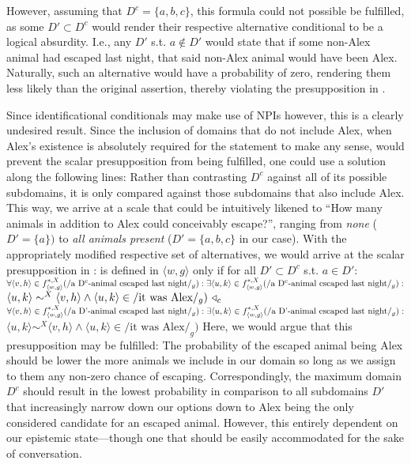 \xe
However, assuming that $D^c=\{a,b,c\}$, this formula could not possible be fulfilled, as some $D'\subset D^c$ would render their respective alternative conditional to be a logical absurdity. I.e., any $D'$ s.t. $a\not\in D'$ would state that if some non-Alex animal had escaped last night, that said non-Alex animal would have been Alex. Naturally, such an alternative would have a probability of zero, rendering them less likely than the original assertion, thereby violating the presupposition in . 

Since identificational conditionals may make use of NPIs however, this is a clearly undesired result. Since the inclusion of domains that do not include Alex, when Alex's existence is absolutely required for the statement to make any sense, would prevent the scalar presupposition from being fulfilled, one could use a solution along the following lines: Rather than contrasting $D^c$ against all of its possible subdomains, it is only compared against those subdomains that also include Alex. This way, we arrive at a scale that could be intuitively likened to \enquote{How many animals in addition to Alex could conceivably escape?}, ranging from \textit{none} ($D'=\{a\})$ to \textit{all animals present} ($D'=\{a,b,c\}$ in our case). With the appropriately modified respective set of alternatives, we would arrive at the scalar presupposition in :
\ex
{}\linebreak
is defined in $\langle w,g\rangle$ only if for all $D'\subset D^c$ s.t. $a\in D'$:\\
$\forall{\langle v,h\rangle\in f^{*,X}_{\langle w,g\rangle}(/\text{a D\textsuperscript{c}-animal escaped last night}/_g)}:\\\exists\langle u,k\rangle\in f^{*,X}_{\langle w,g\rangle}(/\text{a D\textsuperscript{c}-animal escaped last night}/_g):$\\\emptyfill$\langle u,k\rangle\sim^X\langle v,h\rangle\land\langle u,k\rangle\in/\text{it was Alex}/_g)~\triangleleft_c$\\
$\forall{\langle v,h\rangle\in f^{*,X}_{\langle w,g\rangle}(/\text{a D'-animal escaped last night}/_g)}:\\\exists\langle u,k\rangle\in f^{*,X}_{\langle w,g\rangle}(/\text{a D'-animal escaped last night}/_g):$\\\emptyfill$\langle u,k\rangle\sim^X\langle v,h\rangle\land\langle u,k\rangle\in/\text{it was Alex}/_g)$
\xe
Here, we would argue that this presupposition may be fulfilled: The probability of the escaped animal being Alex should be lower the more animals we include in our domain so long as we assign to them any non-zero chance of escaping. Correspondingly, the maximum domain $D^c$ should result in the lowest probability in comparison to all subdomains $D'$ that increasingly narrow down our options down to Alex being the only considered candidate for an escaped animal. However, this entirely dependent on our epistemic state---though one that should be easily accommodated for the sake of conversation.

